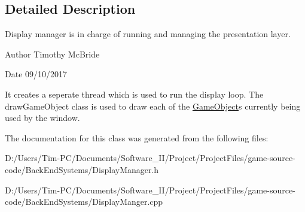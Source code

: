 \subsection{Detailed Description}
Display manager is in charge of running and managing the presentation layer. 

\begin{DoxyAuthor}{Author}
Timothy Mc\+Bride 
\end{DoxyAuthor}
\begin{DoxyDate}{Date}
09/10/2017
\end{DoxyDate}
It creates a seperate thread which is used to run the display loop. The draw\+Game\+Object class is used to draw each of the \hyperlink{class_game_object}{Game\+Object}\textquotesingle{}s currently being used by the window. 

The documentation for this class was generated from the following files\+:\begin{DoxyCompactItemize}
\item 
D\+:/\+Users/\+Tim-\/\+P\+C/\+Documents/\+Software\+\_\+\+I\+I/\+Project/\+Project\+Files/game-\/source-\/code/\+Back\+End\+Systems/Display\+Manager.\+h\item 
D\+:/\+Users/\+Tim-\/\+P\+C/\+Documents/\+Software\+\_\+\+I\+I/\+Project/\+Project\+Files/game-\/source-\/code/\+Back\+End\+Systems/Display\+Manger.\+cpp\end{DoxyCompactItemize}
